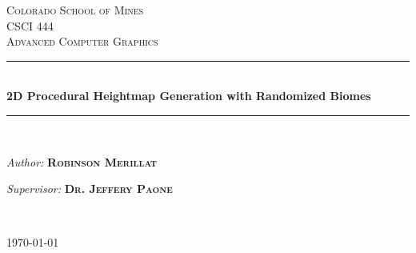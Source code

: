 \documentclass[12pt]{article}
\begin{document}
\begin{titlepage}

\newcommand{\HRule}{\rule{\linewidth}{0.5mm}} %

\center %
 

\textsc{\LARGE Colorado School of Mines}\\[1.5cm] %
\textsc{\Large CSCI 444}\\[0.5cm] %
\textsc{\large Advanced Computer Graphics}\\[0.5cm] %


\HRule \\[0.6cm]
{ \huge \bfseries 2D Procedural Heightmap Generation with Randomized Biomes}\\[0.4cm] %
\HRule \\[1.0cm]
 

\begin{minipage}{0.4\textwidth}
    \begin{flushleft}
        \emph{Author:}  
        \medskip
        {\textsc{\textbf{Robinson Merillat }}}   %
    \end{flushleft}
\end{minipage}
\begin{minipage}{0.45\textwidth}
    \begin{flushright} \large
        \emph{Supervisor:}
        {\textsc{\textbf{Dr. Jeffery Paone }}} %
    \end{flushright}
\end{minipage}\\[1cm]

\begin{center}
{\large \today}
\end{center}


\end{titlepage}
\end{document}
